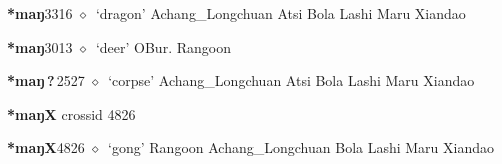   \begin{list}{}{\leftmargin=1.5em \itemindent=-1.5em}
  \item {\footnotesize \textbf{*maŋ}}{\tiny 3316}
         $\diamond$~`dragon'
         Achang\_Longchuan 
\hspace{1ex}
         Atsi 
\hspace{1ex}
         Bola 
\hspace{1ex}
         Lashi 
\hspace{1ex}
         Maru 
\hspace{1ex}
         Xiandao 
  \item {\footnotesize \textbf{*maŋ}}{\tiny 3013}
\hspace{1ex}
         $\diamond$~`deer'
         OBur. 
\hspace{1ex}
         Rangoon 
  \item {\footnotesize \textbf{*maŋ\,?\,}}{\tiny 2527}
\hspace{1ex}
         $\diamond$~`corpse'
         Achang\_Longchuan 
\hspace{1ex}
         Atsi 
\hspace{1ex}
         Bola 
\hspace{1ex}
         Lashi 
\hspace{1ex}
         Maru 
\hspace{1ex}
         Xiandao 
  \end{list}
\item
\textbf{*maŋX}
  {\tiny crossid 4826}
  \begin{list}{}{\leftmargin=1.5em \itemindent=-1.5em}
  \item {\footnotesize \textbf{*maŋX}}{\tiny 4826}
         $\diamond$~`gong'
         Rangoon 
\hspace{1ex}
         Achang\_Longchuan 
\hspace{1ex}
         Bola 
\hspace{1ex}
         Lashi 
\hspace{1ex}
         Maru 
\hspace{1ex}
         Xiandao 
  \end{list}
